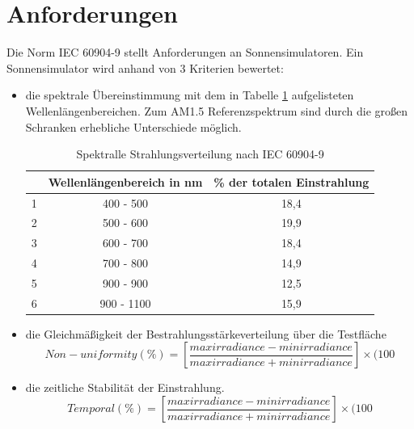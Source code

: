 \documentclass[a4paper,bibtotoc,oneside]{scrbook}
\begin{document}
\section{Anforderungen}\thispagestyle{empty}
Die Norm IEC 60904-9 \cite{norm9} stellt Anforderungen an Sonnensimulatoren. Ein Sonnensimulator wird anhand von 3 Kriterien bewertet: 
\begin{itemize}
\item die spektrale Übereinstimmung mit dem in Tabelle \ref{TabS1} aufgelisteten Wellenlängenbereichen. Zum AM1.5 Referenzspektrum sind durch die großen Schranken erhebliche Unterschiede möglich.
\begin{table}[htbp]
\centering
\begin{tabular}{ | c | c | c |}\hline
{\bf } & {\bf Wellenlängenbereich in nm} & {\bf \% der totalen Einstrahlung}\\ \hline
\hline
1  & 400 - 500 & 18,4 \\ \hline
2  & 500 - 600 & 19,9\\ \hline
3  & 600 - 700 & 18,4\\ \hline
4  & 700 - 800 & 14,9\\ \hline
5  & 900 - 900 & 12,5\\ \hline
6  & 900 - 1100 & 15,9\\ \hline
\end{tabular}
\caption{Spektralle Strahlungsverteilung nach IEC 60904-9}\label{TabS1}
\end{table}
\item die Gleichmäßigkeit der Bestrahlungsstärkeverteilung über die Testfläche
	\begin{equation}
 Non-uniformity (\%) = [\frac{max irradiance - min irradiance}{max irradiance + min irradiance}] \times (100%
\end{equation}
\item die zeitliche Stabilität der Einstrahlung.
\begin{equation}
 Temporal (\%) = [\frac{max irradiance - min irradiance}{max irradiance + min irradiance}] \times (100%
\end{equation}
\end{itemize}
\end{document}
